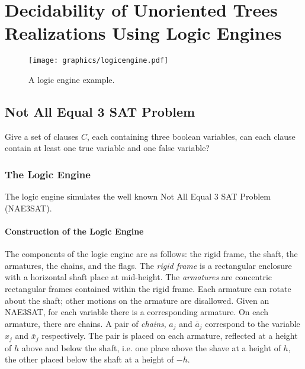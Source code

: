 \chapter{Decidability of Unoriented Trees Realizations Using Logic Engines}
\begin{figure}[!htbp]
\begin{center}
\texttt{[image: graphics/logicengine.pdf]}
\caption{A logic engine example.}\label{fig:logicengine-1}
\end{center}
\end{figure}
\section{Not All Equal 3 SAT Problem}
\begin{prob}\label{prob:Satisfiability-2}%
Give a set of clauses $C$, each containing three boolean variables, can each clause contain at
least one true variable and one false variable?
\end{prob}
\subsection{The Logic Engine}
The logic engine simulates the well known Not All Equal 3 SAT Problem (NAE3SAT).
\subsubsection{Construction of the Logic Engine}
The components of the logic engine are as follows: the rigid frame, the shaft, the armatures,
the chains, and the flags.  The \textit{rigid frame} is a rectangular enclosure with a horizontal
shaft place at mid-height.  The \textit{armatures} are concentric rectangular frames contained
within the rigid frame.  Each armature can rotate about the shaft; other motions on the armature
are disallowed.  Given an NAE3SAT, for each variable there is a corresponding armature. On each
armature, there are chains.  A pair of \textit{chains}, $a_j$ and $\bar{a}_j$ correspond to the
variable $x_j$ and $\bar{x}_j$ respectively.  The pair is placed on each armature, reflected at a
height of $h$ above and below the shaft, i.e. one place above the shave at a height of $h$, the
other placed below the shaft at a height of $-h$.


